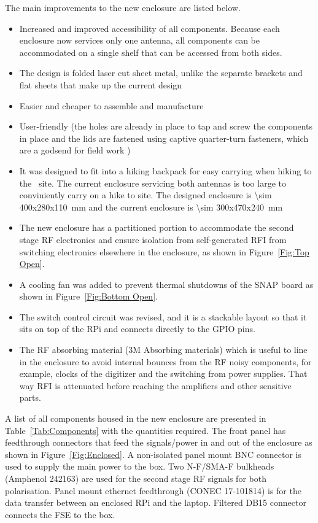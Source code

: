 The main improvements to the new enclosure are listed below.

\begin{itemize}
	\item Increased and improved accessibility of all components. Because each enclosure now services only one antenna, all components can be accommodated on a single shelf that can be accessed from both sides.
	\item The design is folded laser cut sheet metal, unlike the separate brackets and flat sheets that make up the current design
	\item Easier and cheaper to assemble and manufacture
	\item User-friendly (the holes are already in place to tap and screw the components in place and the lids are fastened using captive quarter-turn fasteners, which are a godsend for field work )
	\item It was designed to fit into a hiking backpack for easy carrying when hiking to the \prizm\ site. The current enclosure servicing both antennas is too large to conviniently carry on a hike to site. The designed enclosure is \SI{\sim 400x280x110}{\milli \meter} and the current enclosure is \SI{\sim 300x470x240}{\milli \meter} 
	\item The new enclosure has a partitioned portion to accommodate the second stage RF electronics and ensure isolation from self-generated RFI from switching electronics elsewhere in the enclosure, as shown in Figure~\ref{Fig:Top Open}.
	\item A cooling fan was added to prevent thermal shutdowns of the SNAP board as shown in Figure~\ref{Fig:Bottom Open}.
	\item The switch control circuit was revised, and it is a stackable layout so that it sits on top of the RPi and connects directly to the GPIO pins.
    \item The RF absorbing material (3M Absorbing materials) which is useful to line in the enclosure to avoid internal bounces from the RF noisy components, for example, clocks of the digitizer and the switching from power supplies. That way RFI is attenuated before reaching the amplifiers and other sensitive parts. 
\end{itemize}

A list of all components housed in the new enclosure are presented in Table~\ref{Tab:Components} with the quantities required. The front panel has feedthrough connectors that feed the signals/power in and out of the enclosure as shown in Figure~\ref{Fig:Enclosed}. A non-isolated panel mount BNC connector is used to supply the main power to the box. Two N-F/SMA-F bulkheads (Amphenol 242163) are used for the second stage RF signals for both polarisation. Panel mount ethernet feedthrough (CONEC 17-101814) is for the data transfer between an enclosed RPi and the laptop. Filtered DB15 connector connects the FSE to the box.

